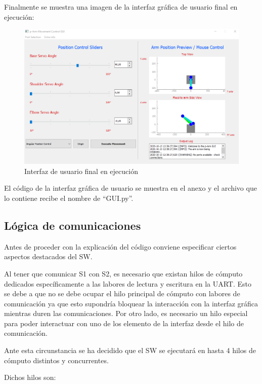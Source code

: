 Finalmente se muestra una imagen de la interfaz gráfica de usuario final en ejecución:
\begin{figure}[H]
    \centering
    \includegraphics[width=0.85\linewidth]{pictures/Gui_Final.png}
    \caption{Interfaz de usuario final en ejecución}
    \label{fig:ui_finalexe}
\end{figure}

El código de la interfaz gráfica de usuario se muestra en el anexo y el archivo que lo contiene recibe el nombre de ``GUI.py''.


\subsection{Lógica de comunicaciones}
Antes de proceder con la explicación del código conviene especificar ciertos aspectos destacados del \ac{SW}.

Al tener que comunicar \ac{S1} con \ac{S2}, es necesario que existan hilos de cómputo dedicados específicamente a las labores de lectura y escritura en la UART. Esto se debe a que no se debe ocupar el hilo principal de cómputo con labores de comunicación ya que esto supondría bloquear la interacción con la interfaz gráfica mientras duren las comunicaciones.
Por otro lado, es necesario un hilo especial para poder interactuar con uno de los elemento de la interfaz desde el hilo de comunicación.

Ante esta circunstancia se ha decidido que el \ac{SW} se ejecutará en hasta 4 hilos de cómputo distintos y concurrentes.

Dichos hilos son:

